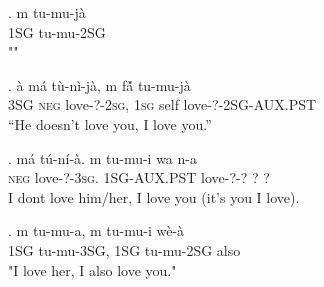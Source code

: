 \documentclass{assets/fieldnotes}
\begin{document}
\exg. m tu-mu-jà\\
1SG   tu-mu-2SG\\
""

\exg. à má tù-nì-jà, m fá̃ tu-mu-jà\\
3\textsc{SG} \textsc{neg} love-?-2\textsc{sg}, 1\textsc{sg} self love-?-2\textsc{SG-AUX.PST}\\
``He doesn't love you, I love you.''

\exg. má tú-ní-à. m tu-mu-i wa n-a\\
\textsc{neg} love-?-3\textsc{sg}. 1\textsc{SG-AUX.PST} love-?-? ? ?\\
I dont love him/her, I love you (it's you I love).

\exg. m tu-mu-a, m tu-mu-i wè-à\\
1SG tu-mu-3SG, 1SG tu-mu-2SG also\\
"I love her, I also love you."
\end{document}
